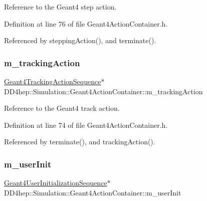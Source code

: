 Reference to the Geant4 step action. 



Definition at line 76 of file Geant4\+Action\+Container.\+h.



Referenced by stepping\+Action(), and terminate().

\hypertarget{class_d_d4hep_1_1_simulation_1_1_geant4_action_container_a5a39104d6cb2d3d0c578ddb50fbb988b}{}\label{class_d_d4hep_1_1_simulation_1_1_geant4_action_container_a5a39104d6cb2d3d0c578ddb50fbb988b} 
\subsubsection{\texorpdfstring{m\+\_\+tracking\+Action}{m\_trackingAction}}
{\footnotesize\ttfamily \hyperlink{class_d_d4hep_1_1_simulation_1_1_geant4_tracking_action_sequence}{Geant4\+Tracking\+Action\+Sequence}$\ast$ D\+D4hep\+::\+Simulation\+::\+Geant4\+Action\+Container\+::m\+\_\+tracking\+Action\hspace{0.3cm}{\ttfamily [protected]}}



Reference to the Geant4 track action. 



Definition at line 74 of file Geant4\+Action\+Container.\+h.



Referenced by terminate(), and tracking\+Action().

\hypertarget{class_d_d4hep_1_1_simulation_1_1_geant4_action_container_a921172979d5e4b7be0b166f47b67d6fd}{}\label{class_d_d4hep_1_1_simulation_1_1_geant4_action_container_a921172979d5e4b7be0b166f47b67d6fd} 
\subsubsection{\texorpdfstring{m\+\_\+user\+Init}{m\_userInit}}
{\footnotesize\ttfamily \hyperlink{class_d_d4hep_1_1_simulation_1_1_geant4_user_initialization_sequence}{Geant4\+User\+Initialization\+Sequence}$\ast$ D\+D4hep\+::\+Simulation\+::\+Geant4\+Action\+Container\+::m\+\_\+user\+Init\hspace{0.3cm}{\ttfamily [protected]}}



